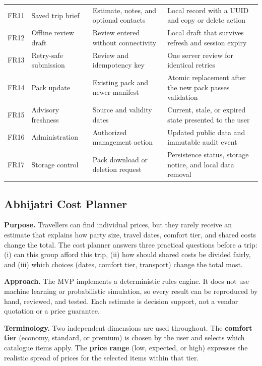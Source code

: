 \documentclass[11pt,a4paper]{article}
\begin{document}
{\begin{longtable}{L{11mm}L{28mm}L{43mm}L{59mm}}
FR11 & Saved trip brief & Estimate, notes, and optional contacts & Local record with a UUID and copy or delete action \\
FR12 & Offline review draft & Review entered without connectivity & Local draft that survives refresh and session expiry \\
FR13 & Retry-safe submission & Review and idempotency key & One server review for identical retries \\
FR14 & Pack update & Existing pack and newer manifest & Atomic replacement after the new pack passes validation \\
FR15 & Advisory freshness & Source and validity dates & Current, stale, or expired state presented to the user \\
FR16 & Administration & Authorized management action & Updated public data and immutable audit event \\
FR17 & Storage control & Pack download or deletion request & Persistence status, storage notice, and local data removal \\
\end{longtable}
}

\subsection{Abhijatri Cost Planner}\label{sec:planner}
\textbf{Purpose.} Travellers can find individual prices, but they rarely receive an estimate that explains how party size, travel dates, comfort tier, and shared costs change the total. The cost planner answers three practical questions before a trip: (i) can this group afford this trip, (ii) how should shared costs be divided fairly, and (iii) which choices (dates, comfort tier, transport) change the total most.

\textbf{Approach.} The MVP implements a deterministic rules engine. It does not use machine learning or probabilistic simulation, so every result can be reproduced by hand, reviewed, and tested. Each estimate is decision support, not a vendor quotation or a price guarantee.

\textbf{Terminology.} Two independent dimensions are used throughout. The \textbf{comfort tier} (economy, standard, or premium) is chosen by the user and selects which catalogue items apply. The \textbf{price range} (low, expected, or high) expresses the realistic spread of prices for the selected items within that tier.
\end{document}
